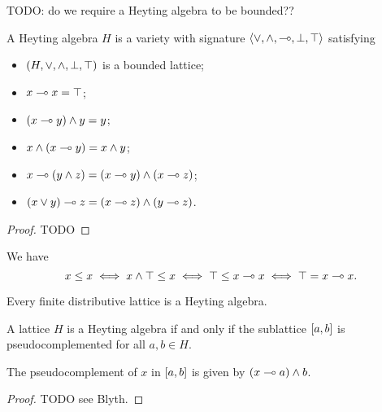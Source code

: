 TODO: do we require a Heyting algebra to be bounded??

\begin{lemma}
A Heyting algebra $H$ is a variety with signature $\left\langle \vee, \wedge, \multimap, \bot,\top \right\rangle$ satisfying
\begin{itemize}
\item $\sSet{H, \vee, \wedge, \bot, \top}$ is a bounded lattice;
\item $x\multimap x = \top$;
\item $(x\multimap y)\wedge y = y$;
\item $x\wedge (x\multimap y) = x\wedge y$;
\item $x\multimap (y\wedge z) = (x\multimap y)\wedge(x\multimap z)$;
\item $(x\vee y)\multimap z = (x\multimap z)\wedge(y\multimap z)$.
\end{itemize}
\end{lemma}
\begin{proof}
TODO
\end{proof}

We have
\[ x\leq x \iff x\wedge \top \leq x \iff \top \leq x\multimap x \iff \top = x\multimap x. \]

\begin{lemma}
Every finite distributive lattice is a Heyting algebra.
\end{lemma}


\begin{proposition}
A lattice $H$ is a Heyting algebra \textup{if and only if} the sublattice $\interval{a,b}$ is pseudocomplemented for all $a,b\in H$.
\end{proposition}
The pseudocomplement of $x$ in $\interval{a,b}$ is given by $(x\multimap a)\wedge b$.
\begin{proof}
TODO see Blyth.
\end{proof}

